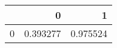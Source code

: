 \begin{tabular}{lrr}
\toprule
{} &         0 &         1 \\
\midrule
0 &  0.393277 &  0.975524 \\
\bottomrule
\end{tabular}
